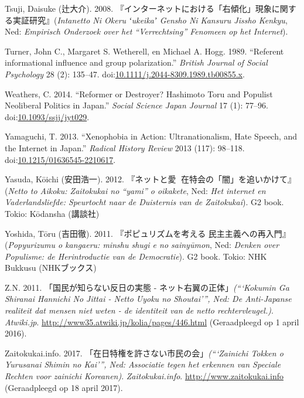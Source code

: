 \documentclass[10.5pt,dutch,]{article}
\begin{document}
\hypertarget{ref-tsujiux5fintanettoux5f2008}{}
Tsuji, Daisuke (辻大介). 2008. 『インターネットにおける「右傾化」現象に関する実証研究』(\emph{Intanetto Ni Okeru ʻukeikaʼ Gensho Ni Kansuru Jissho Kenkyu}, Ned: \emph{Empirisch Onderzoek over het “Verrechtsing” Fenomeen op het Internet}).

\hypertarget{ref-turnerux5freferentux5f1989}{}
Turner, John C., Margaret S. Wetherell, en Michael A. Hogg. 1989.
“Referent informational influence and group polarization.” \emph{British
Journal of Social Psychology} 28 (2): 135--47.
doi:\href{https://doi.org/10.1111/j.2044-8309.1989.tb00855.x}{10.1111/j.2044-8309.1989.tb00855.x}.

\hypertarget{ref-weathersux5freformerux5f2014}{}
Weathers, C. 2014. “Reformer or Destroyer? Hashimoto Toru and Populist
Neoliberal Politics in Japan.” \emph{Social Science Japan Journal} 17
(1): 77--96.
doi:\href{https://doi.org/10.1093/ssjj/jyt029}{10.1093/ssjj/jyt029}.

\hypertarget{ref-yamaguchiux5fxenophobiaux5f2013}{}
Yamaguchi, T. 2013. “Xenophobia in Action: Ultranationalism, Hate Speech,
and the Internet in Japan.” \emph{Radical History Review} 2013 (117):
98--118.
doi:\href{https://doi.org/10.1215/01636545-2210617}{10.1215/01636545-2210617}.

\hypertarget{ref-yasudaux5fnettoux5f2012}{}
Yasuda, Kōichi (安田浩一). 2012. 『ネットと愛国̶ 在特会の「闇」を追いかけて』(\emph{Netto to Aikoku: Zaitokukai
no “yami” o oikakete}, Ned: \emph{Het internet en Vaderlandsliefde: Speurtocht naar de Duisternis van de
Zaitokukai}). G2 book. Tokio: Kōdansha (講談社)

\hypertarget{ref-yoshidaux5fpopyurizumuux5f2011}{}
Yoshida, Tōru (吉田徹). 2011. 『ポピュリズムを考える 民主主義への再入門』(\emph{Popyurizumu o kangaeru: minshu shugi e no sainyūmon}, Ned: \emph{Denken over Populisme: de Herintroductie van de Democratie}). G2 book. Tokio: NHK Bukkusu (NHKブックス)

\hypertarget{ref-z.n.ux5fkokuminux5f2011}{}
Z.N. 2011. 「国民が知らない反日の実態 - ネット右翼の正体」\emph{(“‘Kokumin Ga Shiranai Hannichi No Jittai - Netto Uyoku no Shoutai’”, Ned:  De Anti-Japanse realiteit dat mensen niet weten - de identiteit van de netto rechtervleugel.)}. \emph{Atwiki.jp}. \url{http://www35.atwiki.jp/kolia/pages/446.html} (Geraadpleegd op 1 april 2016).

\hypertarget{ref-zaitokukai.infoux5fzaitokukaiux5f2017}{}
Zaitokukai.info. 2017. 「在日特権を許さない市民の会」\emph{(“‘Zainichi Tokken o Yurusanai Shimin no Kai’”, Ned:  Associatie tegen het erkennen van Speciale Rechten voor zainichi Koreanen)}. \emph{Zaitokukai.info}. \url{http://www.zaitokukai.info} (Geraadpleegd op 18 april 2017).
\end{document}
